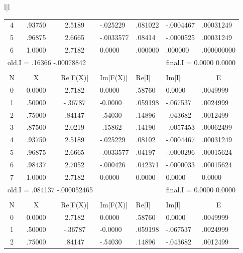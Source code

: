 \begin{figure}
\begin{tabular}{l|l}
\begin{tabular}{cccllll}
            4 & .93750 & 2.5189  & -.025229  & .081022 & -.0004467 & .00031249 \\
            5 & .96875 & 2.6665  & -.0033577 & .08414  & -.0000525 & .00031249 \\
            6 & 1.0000 & 2.7182  & 0.0000    & .000000 &  .000000  & .000000000 \\
            \multicolumn{3}{l}{old.I = .16366 -.00078842} & &
            \multicolumn{3}{r}{final.I = 0.0000 0.0000} \\
        \\
            \multicolumn{1}{c}{N}        & \multicolumn{1}{c}{X} &           \multicolumn{1}{c}{Re[F(X)]} & \multicolumn{1}{l}{Im[F(X)]} & 
            \multicolumn{1}{l}{Re[I]}    & \multicolumn{1}{l}{Im[I]} &
            \multicolumn{1}{c}{E} \\
            0 & 0.0000 & 2.7182  &  0.0000    & .58760  & 0.0000    & .0049999 \\
            1 & .50000 & -.36787 & -0.0000    & .059198 & -.067537  & .0024999 \\
            2 & .75000 &  .84147 &  -.54030   & .14896  & -.043682  & .0012499 \\
            3 & .87500 & 2.0219  &  -.15862   & .14190  & -.0057453 & .00062499 \\
            4 & .93750 & 2.5189  &  -.025229  & .08102  & -.0004467 & .00031249 \\
            5 & .96875 & 2.6665  &  -.0033577 & .04197  & -.0000296 & .00015624 \\
            6 & .98437 & 2.7052  &  -.000426  & .042371 & -.0000033 & .00015624 \\
            7 & 1.0000 & 2.7182  &  0.0000    & 0.0000  & 0.0000    & 0.0000 \\
            \multicolumn{3}{l}{old.I = .084137 -.000052465} & &
            \multicolumn{3}{r}{final.I = 0.0000 0.0000}     \\
        \\
            \multicolumn{1}{c}{N}        & \multicolumn{1}{c}{X} &           \multicolumn{1}{c}{Re[F(X)]} & \multicolumn{1}{l}{Im[F(X)]} & 
            \multicolumn{1}{l}{Re[I]}    & \multicolumn{1}{l}{Im[I]} &
            \multicolumn{1}{c}{E} \\
            0 & 0.0000 & 2.7182  &  0.0000   & .58760  & 0.0000    & .0049999 \\
            1 & .50000 & -.36787 & -0.0000   & .059198 & -.067537  & .0024999 \\
            2 & .75000 &  .84147 &  -.54030  & .14896  & -.043682  & .0012499 \\

\end{tabular}
\end{tabular}
\end{figure}
